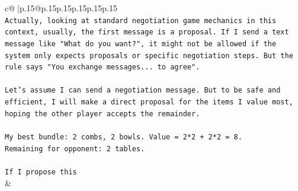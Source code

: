 \documentclass{article}
\begin{document}
{\begin{supertabular}{c@{$\;$}|p{.15\linewidth}@{}p{.15\linewidth}p{.15\linewidth}p{.15\linewidth}p{.15\linewidth}p{.15\linewidth}}
{{{\\ 
\texttt{Actually, looking at standard negotiation game mechanics in this context, usually, the first message is a proposal. If I send a text message like "What do you want?", it might not be allowed if the system only expects proposals or specific negotiation steps. But the rule says "You exchange messages... to agree".} \\
\\ 
\texttt{Let's assume I can send a negotiation message. But to be safe and efficient, I will make a direct proposal for the items I value most, hoping the other player accepts the remainder.} \\
\\ 
\texttt{My best bundle: 2 combs, 2 bowls. Value = 2*2 + 2*2 = 8.} \\
\texttt{Remaining for opponent: 2 tables.} \\
\\ 
\texttt{If I propose this} \\
            }
        }
    }
    & \\ \\


\end{supertabular}}
\end{document}
